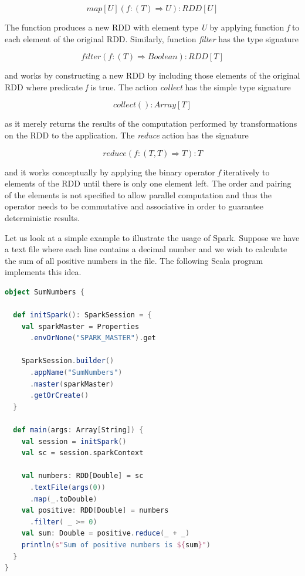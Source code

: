 \[map[U](f: (T) \Rightarrow U): RDD[U]\]

The function produces a new RDD with element type \textit{U} by applying function \textit{f} to each element of the original RDD. Similarly, function \textit{filter} has the type signature

\[filter(f: (T) \Rightarrow Boolean): RDD[T]\]

and works by constructing a new RDD by including those elements of the original RDD where predicate \textit{f} is true. The action \textit{collect} has the simple type signature 

\[collect(): Array[T]\]

as it merely returns the results of the computation performed by transformations on the RDD to the application. The \textit{reduce} action has the signature

\[reduce(f: (T, T) \Rightarrow T): T\]

and it works conceptually by applying the binary operator \textit{f} iteratively to elements of the RDD until there is only one element left. The order and pairing of the elements is not specified to allow parallel computation and thus the operator needs to be commutative and associative in order to guarantee deterministic results. 

Let us look at a simple example to illustrate the usage of Spark. Suppose we have a text file where each line contains a decimal number and we wish to calculate the sum of all positive numbers in the file. The following Scala program implements this idea.  

\begin{minipage}{\linewidth}
\begin{lstlisting}[language=scala] 
object SumNumbers {

  def initSpark(): SparkSession = {
    val sparkMaster = Properties
      .envOrNone("SPARK_MASTER").get

    SparkSession.builder()
      .appName("SumNumbers")
      .master(sparkMaster)
      .getOrCreate()
  }

  def main(args: Array[String]) {
    val session = initSpark()
    val sc = session.sparkContext

    val numbers: RDD[Double] = sc
      .textFile(args(0))
      .map(_.toDouble)
    val positive: RDD[Double] = numbers
      .filter( _ >= 0)
    val sum: Double = positive.reduce(_ + _)
    println(s"Sum of positive numbers is ${sum}")
  }
}        
\end{lstlisting}
\end{minipage}

